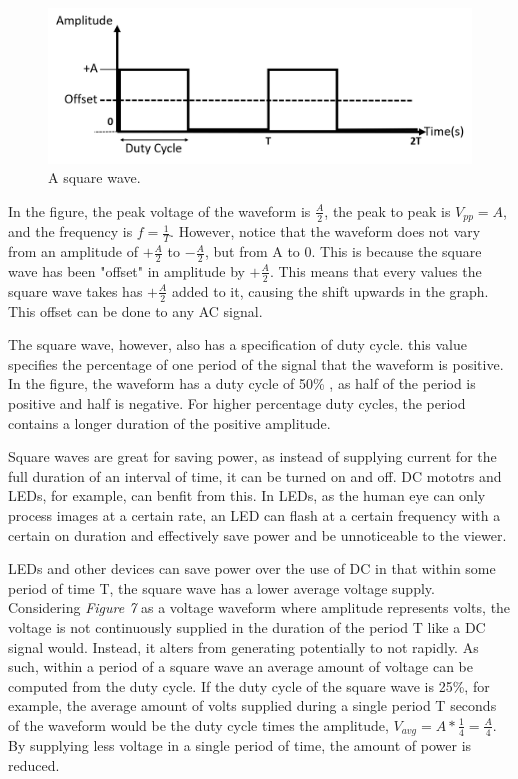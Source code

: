 \documentclass[12pt]{article}
\begin{document}
\begin{figure}[H]
    \centering
    \includegraphics[width=12cm]{photos/prelim/square.png}
    \caption{A square wave.}
\end{figure}

In the figure, the peak voltage of the waveform is $\frac{A}{2}$, the peak to peak is $V_{pp} = A$, and the frequency is $f = \frac{1}{T}$. However, notice that the waveform does not vary from an amplitude of $+\frac{A}{2}$ to $-\frac{A}{2}$, but from A to 0. This is because the square wave has been "offset" in amplitude by $+\frac{A}{2}$. This means that every values the square wave takes has $+\frac{A}{2}$ added to it, causing the shift upwards in the graph. This offset can be done to any AC signal.

The square wave, however, also has a specification of duty cycle. this value specifies the percentage of one period of the signal that the waveform is positive. In the figure, the waveform has a duty cycle of 50\% , as half of the period is positive and half is negative. For higher percentage duty cycles, the period contains a longer duration of the positive amplitude.

Square waves are great for saving power, as instead of supplying current for the full duration of an interval of time, it can be turned on and off. DC mototrs and LEDs, for example, can benfit from this. In LEDs, as the human eye can only process images at a certain rate, an LED can flash at a certain frequency with a certain on duration and effectively save power and be unnoticeable to the viewer. 

LEDs and other devices can save power over the use of DC in that within some period of time T, the square wave has a lower average voltage supply. Considering \textit{Figure 7} as a voltage waveform where amplitude represents volts, the voltage is not continuously supplied in the duration of the period T like a DC signal would. Instead, it alters from generating potentially to not rapidly. As such, within a period of a square wave an average amount of voltage can be computed from the duty cycle. If the duty cycle of the square wave is 25\%, for example, the average amount of volts supplied during a single period T seconds of the waveform would be the duty cycle times the amplitude, $V_{avg} = A * \frac{1}{4} = \frac{A}{4}$. By supplying less voltage in a single period of time, the amount of power is reduced.
\end{document}
